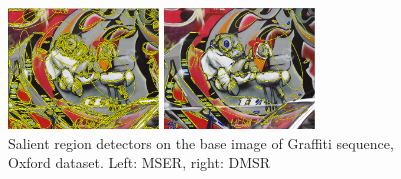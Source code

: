 \documentclass{article}
\begin{document}
\begin{figure}[htb]

\begin{minipage}[b]{.49\linewidth}
  \centering
  \centerline{\includegraphics[width=4.0cm]{./Figs/mserGraffiti1}}
\end{minipage}
\hfill
\begin{minipage}[b]{0.49\linewidth}
  \centering
  \centerline{\includegraphics[width=4.0cm]{./Figs/dmsrGraffiti1}}
\end{minipage}
\vspace{-0.25cm}
\caption{Salient region detectors on the base image of Graffiti sequence, Oxford dataset. Left: MSER, right: DMSR}
\label{fig:det_graffiti}
%
\end{figure}
\end{document}
